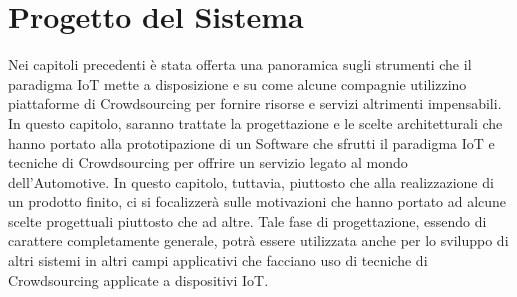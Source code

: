 \chapter{Progetto del Sistema}
\label{chap:tre}
Nei capitoli precedenti è stata offerta una panoramica sugli strumenti che il paradigma IoT mette a disposizione e su come alcune compagnie utilizzino piattaforme di Crowdsourcing per fornire risorse e servizi altrimenti impensabili.\\
In questo capitolo, saranno trattate la progettazione e le scelte architetturali che hanno portato alla prototipazione di un Software che sfrutti il paradigma IoT e tecniche di Crowdsourcing per offrire un servizio legato al mondo dell'Automotive. In questo capitolo, tuttavia, piuttosto che alla realizzazione di un prodotto finito, ci si focalizzerà sulle motivazioni che hanno portato ad alcune scelte progettuali piuttosto che ad altre. Tale fase di progettazione, essendo di carattere completamente generale, potrà essere utilizzata anche per lo sviluppo di altri sistemi in altri campi applicativi che facciano uso di tecniche di Crowdsourcing applicate a dispositivi IoT.\\

